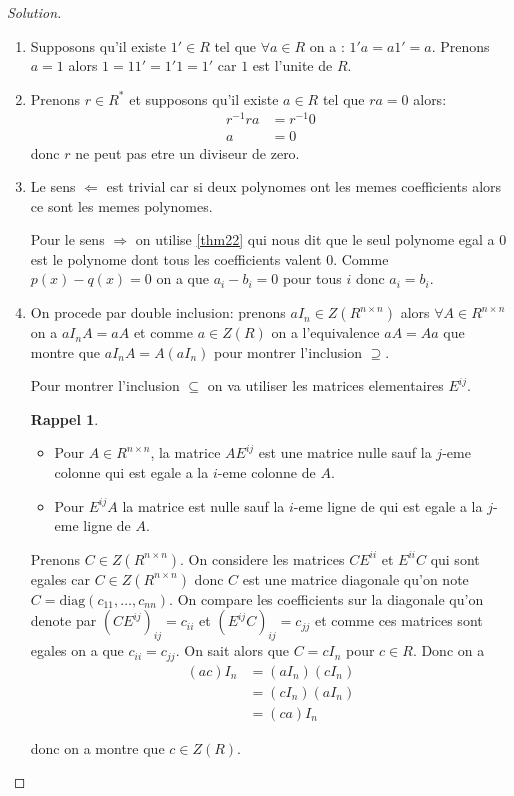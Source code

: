 \documentclass[a4paper,12pt,french]{report}
\theoremstyle{plain}
\theoremstyle{definition}
\newtheorem*{reminder}{Rappel}
\begin{document}
\begin{proof}[Solution]
\begin{enumerate}
\item Supposons qu'il existe $1'\in R$ tel que $\forall a\in R$ on a : $1'a=a1'=a$. Prenons $a=1$ alors $1=11'=1'1=1'$ car $1$ est l'unite de $R$.
\item Prenons $r\in R^{*}$ et supposons qu'il existe $a\in R$ tel que $ra=0$ alors:
\begin{align*}
r^{-1}ra & =r^{-1}0 \\
a & =0
\end{align*}
donc $r$ ne peut pas etre un diviseur de zero.
\item Le sens $\Leftarrow$ est trivial car si deux polynomes ont les memes coefficients alors ce sont les memes polynomes.

Pour le sens $\Rightarrow$ on utilise \ref{thm22} qui nous dit que le seul polynome egal a 0 est le polynome dont tous les coefficients valent 0. Comme $p(x)-q(x)=0$ on a que $a_{i}-b_{i}=0$ pour tous $i$ donc $a_{i}=b_{i}$.
\item On procede par double inclusion: prenons $aI_{n}\in Z(R^{n\times n})$ alors $\forall A\in R^{n\times n}$ on a $aI_{n}A=aA$ et comme $a\in Z(R)$ on a l'equivalence $aA=Aa$ que montre que $aI_{n}A=A(aI_{n})$ pour montrer l'inclusion $\supseteq$.

Pour montrer l'inclusion $\subseteq$ on va utiliser les matrices elementaires $E^{ij}$. 
\begin{reminder}
\begin{itemize}
\item Pour $A\in R^{n\times n}$, la matrice $AE^{ij}$ est une matrice nulle sauf la $j$-eme colonne qui est egale a la $i$-eme colonne de $A$.
\item Pour $E^{ij}A$ la matrice est nulle sauf la $i$-eme ligne de qui est egale a la $j$-eme ligne de $A$.
\end{itemize}
\end{reminder}
Prenons $C\in Z(R^{n\times n})$. On considere les matrices $CE^{ii}$ et $E^{ii}C$ qui sont egales car $C\in Z(R^{n\times n})$ donc $C$ est une matrice diagonale qu'on note $C=\mathrm{diag}(c_{11},\dots,c_{nn})$. On compare les coefficients sur la diagonale qu'on denote par $(CE^{ij})_{ij}=c_{ii}$ et $(E^{ij}C)_{ij}=c_{jj}$ et comme ces matrices sont egales on a que $c_{ii}=c_{jj}$. On sait alors que $C=cI_{n}$ pour $c\in R$. Donc on a
\begin{align*}
(ac)I_{n} & =(aI_{n})(cI_{n}) \\
 & =(cI_{n})(aI_{n}) \\
 & =(ca)I_{n} 
\end{align*}

donc on a montre que $c\in Z(R)$.
\end{enumerate}
\end{proof}
\end{document}
